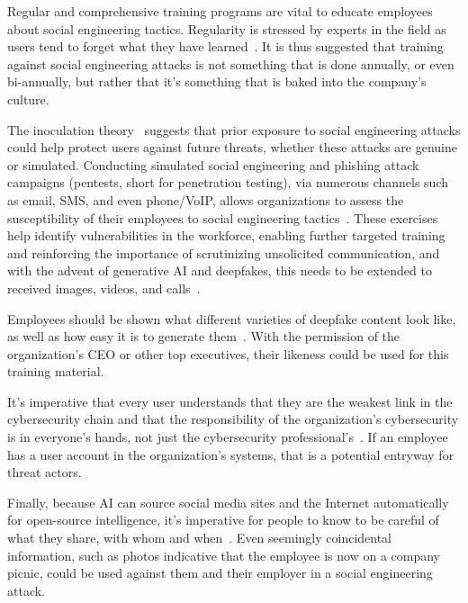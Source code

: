 Regular and comprehensive training programs are vital to educate employees about social engineering tactics. Regularity is stressed by experts in the field as users tend to forget what they have learned~\citep{hadnagy_Social_Engineering_The_Science_2018, mitnick_The_Art_of_Deception_2003}. It is thus suggested that training against social engineering attacks is not something that is done annually, or even bi-annually, but rather that it's something that is baked into the company's culture. 

The inoculation theory~\citep{blauth_AI_Crime_Overview_Malicious_Use_Abuse_2022} suggests that prior exposure to social engineering attacks could help protect users against future threats, whether these attacks are genuine or simulated. Conducting simulated social engineering and phishing attack campaigns (pentests, short for penetration testing), via numerous channels such as email, SMS, and even phone/VoIP, allows organizations to assess the susceptibility of their employees to social engineering tactics~\citep{hadnagy_Social_Engineering_The_Science_2018}. These exercises help identify vulnerabilities in the workforce, enabling further targeted training and reinforcing the importance of scrutinizing unsolicited communication, and with the advent of generative AI and deepfakes, this needs to be extended to received images, videos, and calls~\citep{mirsky_Creation_Detection_Deepfakes_2021}.

Employees should be shown what different varieties of deepfake content look like, as well as how easy it is to generate them~\citep{mirsky_Creation_Detection_Deepfakes_2021}. With the permission of the organization’s CEO or other top executives, their likeness could be used for this training material.

It's imperative that every user understands that they are the weakest link in the cybersecurity chain and that the responsibility of the organization's cybersecurity is in everyone's hands, not just the cybersecurity professional's~\citep{mitnick_The_Art_of_Deception_2003}. If an employee has a user account in the organization’s systems, that is a potential entryway for threat actors.

Finally, because AI can source social media sites and the Internet automatically for open-source intelligence, it's imperative for people to know to be careful of what they share, with whom and when~\citep{mitnick_The_Art_of_Deception_2003}. Even seemingly coincidental information, such as photos indicative that the employee is now on a company picnic, could be used against them and their employer in a social engineering attack.
